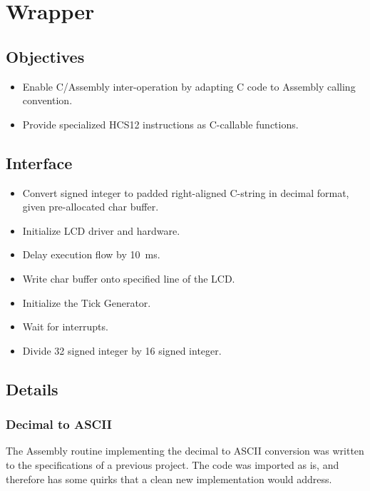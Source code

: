 \chapter{Wrapper}

\section{Objectives}

\begin{itemize}
    \item Enable C/Assembly inter-operation by adapting C code to Assembly calling convention.
    \item Provide specialized HCS12 instructions as C-callable functions.
\end{itemize}

\section{Interface}

\begin{itemize}
    \item Convert signed integer to padded right-aligned C-string in decimal format, given pre-allocated char buffer.
    \item Initialize LCD driver and hardware.
    \item Delay execution flow by \SI{10}{\milli\second}.
    \item Write char buffer onto specified line of the LCD.
    \item Initialize the Tick Generator.
    \item Wait for interrupts.
    \item Divide \SI{32}{\bit} signed integer by \SI{16}{\bit} signed integer.
\end{itemize}

\section{Details}

\subsection{Decimal to ASCII}

The Assembly routine implementing the decimal to ASCII conversion was written to the specifications of a previous project. The code was imported as is, and therefore has some quirks that a clean new implementation would address.

